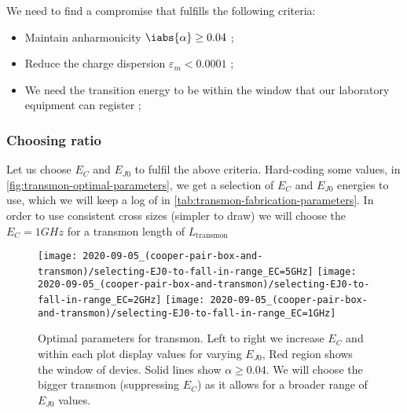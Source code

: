 \begin{framed}\noindent
  \noindent We  need to  find a compromise  that fulfills  the following
  criteria:

  \begin{itemize}
  \item  Maintain   anharmonicity  $\iabs{\alpha}  \ge  0.04   $  \hfill
    ;
  \item  Reduce the  charge dispersion  $\varepsilon_m <  0.0001$ \hfill
    ;
  \item We need  the transition energy to be within  the window that our
    laboratory equipment can register \hfill {};
  \end{itemize}
\end{framed}

\subsubsection{Choosing ratio}
Let  us  choose  $E_C$  and  $E_{J0}$  to  fulfil  the  above  criteria.
Hard-coding  some values,  in \autoref{fig:transmon-optimal-parameters},
we get a selection of $E_C$ and  $E_{J0}$ energies to use, which we will
keep  a  log  of in  \autoref{tab:transmon-fabrication-parameters}.   In
order to use consistent cross sizes (simpler to draw) we will choose the
$E_C=1GHz$ for a transmon length of $L_{\text{transmon}}$

\begin{figure}[h]
  \centering
  \texttt{[image: 2020-09-05\_(cooper-pair-box-and-transmon)/selecting-EJ0-to-fall-in-range\_EC=5GHz]}%
  \texttt{[image: 2020-09-05\_(cooper-pair-box-and-transmon)/selecting-EJ0-to-fall-in-range\_EC=2GHz]}%
  \texttt{[image: 2020-09-05\_(cooper-pair-box-and-transmon)/selecting-EJ0-to-fall-in-range\_EC=1GHz]}%
  \caption{\small  Optimal parameters  for transmon.   Left to  right we
    increase  $E_C$ and  within  each plot  display  values for  varying
    $E_{J0}$, Red region  shows the window of devies.   Solid lines show
    $\alpha \ge 0.04$.  We will  choose the bigger transmon (suppressing
    $E_C$)   as   it   allows   for  a   broader   range   of   $E_{J0}$
    values.\label{fig:transmon-optimal-parameters}}
\end{figure}

